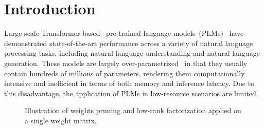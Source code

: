 \section{Introduction}
Large-scale Transformer-based~\cite{transformer} pre-trained language models~(PLMs)~\cite{bert,roberta}  
have demonstrated state-of-the-art performance across a variety of natural language 
processing tasks, including natural language understanding and natural language generation. 
These models are largely over-parametrized~\cite{overpara} in that they usually contain 
hundreds of millions of parameters, rendering them computationally intensive and inefficient in terms 
of both memory and inference latency. Due to this disadvantage, the application of 
PLMs in low-resource scenarios are limited.



\begin{figure}[t!]
	\centering
	\caption{Illustration of weights pruning and low-rank factorization applied on a single weight matrix.}
	\label{fig:intro}
\end{figure}

